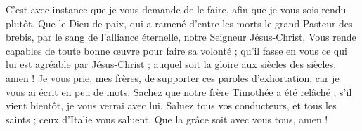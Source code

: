 \begin{multicols}{2}
C’est avec instance que je vous demande de le faire, afin que je vous sois rendu plutôt.
Que le Dieu de paix, qui a ramené d'entre les morts le grand Pasteur des brebis, par le sang de l'alliance éternelle, notre Seigneur Jésus-Christ,
Vous rende capables de toute bonne œuvre pour faire sa volonté ; qu’il fasse en vous ce qui lui est agréable par Jésus-Christ ; auquel soit la gloire aux siècles des siècles, amen !
Je vous prie, mes frères, de supporter ces paroles d'exhortation, car je vous ai écrit en peu de mots.
Sachez que notre frère Timothée a été relâché ; s'il vient bientôt, je vous verrai avec lui.
Saluez tous vos conducteurs, et tous les saints ; ceux d'Italie vous saluent.
Que la grâce soit avec vous tous, amen !
\PPE{}
\end{multicols}

